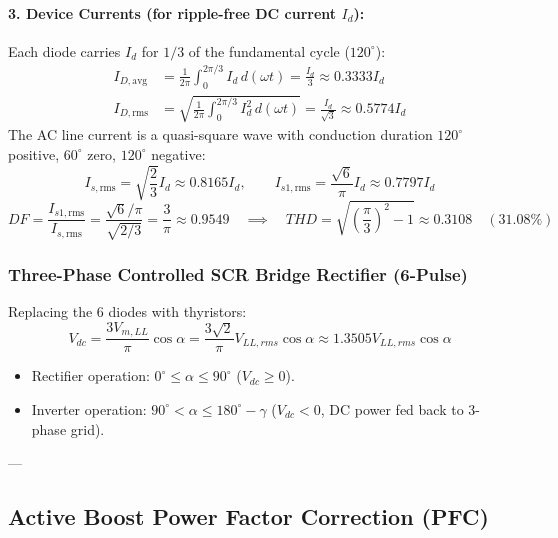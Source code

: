 \paragraph{3. Device Currents (for ripple-free DC current $I_d$):}
Each diode carries $I_d$ for $1/3$ of the fundamental cycle ($120^\circ$):
\begin{align}
I_{D,\mathrm{avg}} &= \frac{1}{2\pi}\int_0^{2\pi/3} I_d\,d(\omega t) = \frac{I_d}{3} \approx 0.3333 I_d \\
I_{D,\mathrm{rms}} &= \sqrt{\frac{1}{2\pi}\int_0^{2\pi/3} I_d^2\,d(\omega t)} = \frac{I_d}{\sqrt{3}} \approx 0.5774 I_d
\end{align}
The AC line current is a quasi-square wave with conduction duration $120^\circ$ positive, $60^\circ$ zero, $120^\circ$ negative:
\begin{equation}
I_{s,\mathrm{rms}} = \sqrt{\frac{2}{3}} I_d \approx 0.8165 I_d, \qquad I_{s1,\mathrm{rms}} = \frac{\sqrt{6}}{\pi} I_d \approx 0.7797 I_d
\end{equation}
\begin{equation}
DF = \frac{I_{s1,\mathrm{rms}}}{I_{s,\mathrm{rms}}} = \frac{\sqrt{6}/\pi}{\sqrt{2/3}} = \frac{3}{\pi} \approx 0.9549 \quad \implies \quad THD = \sqrt{\left(\frac{\pi}{3}\right)^2 - 1} \approx 0.3108 \quad (31.08\%)
\end{equation}

\subsubsection{Three-Phase Controlled SCR Bridge Rectifier (6-Pulse)}
Replacing the 6 diodes with thyristors:
\begin{equation}
V_{dc} = \frac{3 V_{m,LL}}{\pi}\cos\alpha = \frac{3\sqrt{2}}{\pi} V_{LL,rms}\cos\alpha \approx 1.3505 V_{LL,rms}\cos\alpha
\end{equation}
\begin{itemize}
  \item Rectifier operation: $0^\circ \le \alpha \le 90^\circ$ ($V_{dc} \ge 0$).
  \item Inverter operation: $90^\circ < \alpha \le 180^\circ - \gamma$ ($V_{dc} < 0$, DC power fed back to 3-phase grid).
\end{itemize}

---

\subsection{Active Boost Power Factor Correction (PFC)}

